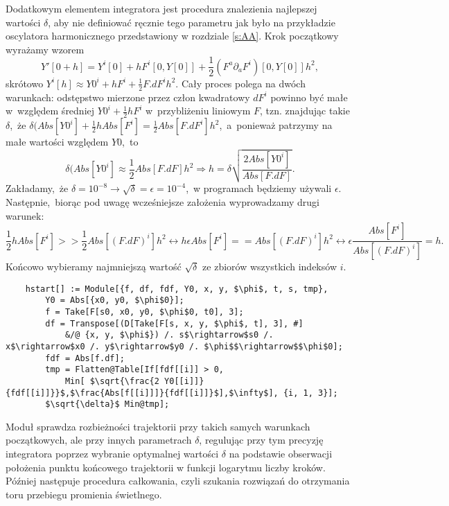 Dodatkowym elementem integratora jest procedura znalezienia najlepszej wartości $\delta$, aby nie definiować ręcznie tego parametru jak było na przykładzie oscylatora harmonicznego przedstawiony w rozdziale \ref{s:AA}. Krok początkowy wyrażamy wzorem 
$$Y'[0+h] = Y^i[0] +h F^i[0,Y[0]]+\frac{1}{2}(F^a \partial_a F^i) [0,Y[0]] h^2,$$
skrótowo $Y^i[h]\approx Y0^i + hF^i +\frac{1}{2} F.dF^i h^2$. Cały proces polega na dwóch warunkach: odstępstwo mierzone przez człon kwadratowy $dF^i$ powinno być małe w~względem średniej $Y0^i + \frac{1}{2}hF^i$ w~przybliżeniu liniowym $F$, tzn. znajdując takie $\delta$,~że $\delta(Abs[Y0^i]+\frac{1}{2}h Abs[F^i] = \frac{1}{2} Abs[F.dF^i] h^2$,~a~ponieważ patrzymy na małe wartości względem $Y0$,~to 
$$\delta(Abs[Y0^i]\approx \frac{1}{2} Abs[F.dF] h^2 \Rightarrow h = \delta \sqrt{\frac{2 Abs[Y0^i]}{Abs[F.dF]}}.$$
Zakładamy,~że $\delta=10^{-8} \rightarrow \sqrt{\delta}=\epsilon=10^{-4}$,~w programach będziemy używali $\epsilon$. Następnie,~biorąc pod uwagę wcześniejsze założenia wyprowadzamy drugi warunek: 
$$\frac{1}{2}h Abs[F^i] >> \frac{1}{2} Abs[(F.dF)^i] h^2 \leftrightarrow h\epsilon Abs[F^i] == Abs [(F.dF)^i] h^2 \leftrightarrow \epsilon \frac{Abs[F^i]}{Abs[(F.dF)^i]}=h.$$ 
Końcowo wybieramy najmniejszą wartość $\sqrt{\delta}$ ze zbiorów wszystkich indeksów $i$.
\begin{lstlisting}
    hstart[] := Module[{f, df, fdf, Y0, x, y, $\phi$, t, s, tmp},
        Y0 = Abs[{x0, y0, $\phi$0}];
        f = Take[F[s0, x0, y0, $\phi$0, t0], 3];
        df = Transpose[(D[Take[F[s, x, y, $\phi$, t], 3], #] 
            &/@ {x, y, $\phi$}) /. s$\rightarrow$s0 /. x$\rightarrow$x0 /. y$\rightarrow$y0 /. $\phi$$\rightarrow$$\phi$0];
        fdf = Abs[f.df];
        tmp = Flatten@Table[If[fdf[[i]] > 0, 
            Min[ $\sqrt{\frac{2 Y0[[i]]}{fdf[[i]]}}$,$\frac{Abs[f[[i]]]}{fdf[[i]]}$],$\infty$], {i, 1, 3}];
        $\sqrt{\delta}$ Min@tmp];
\end{lstlisting}
Moduł sprawdza rozbieżności trajektorii przy takich samych warunkach początkowych, ale przy innych parametrach $\delta$, regulując przy tym precyzję integratora poprzez wybranie optymalnej wartości $\delta$ na podstawie obserwacji położenia punktu końcowego trajektorii w funkcji logarytmu liczby kroków. Później następuje procedura całkowania, czyli szukania rozwiązań do otrzymania toru przebiegu promienia świetlnego.